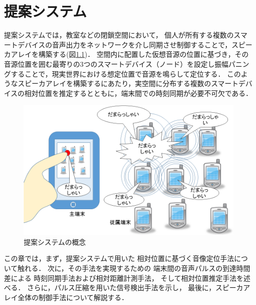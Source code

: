 
\chapter{提案システム}

提案システムでは，教室などの閉鎖空間において，
個人が所有する複数のスマートデバイスの音声出力をネットワークを介し同期させ制御することで，スピーカアレイを構築する(図\ref{fig:shikumi2})．
空間内に配置した仮想音源の位置に基づき，その音源位置を囲む最寄りの3つのスマートデバイス（ノード）を設定し振幅パニングすることで，現実世界における想定位置で音源を鳴らして定位する．
このようなスピーカアレイを構築するにあたり，実空間に分布する複数のスマートデバイスの相対位置を推定するとともに，端末間での時刻同期が必要不可欠である．

\begin{figure}[p]\centering
  \hspace{-2mm}\includegraphics[clip,width=1.1\hsize]{img/shikumi3.png}
  \caption{提案システムの概念}\label{fig:shikumi2}
\end{figure}

この章では，まず，提案システムで用いた
相対位置に基づく音像定位手法について触れる．
次に，その手法を実現するための
端末間の音声パルスの到達時間差による
時刻同期手法および相対距離計測手法，
そして相対位置推定手法を述べる．
さらに，パルス圧縮を用いた信号検出手法を示し，
最後に，スピーカアレイ全体の制御手法について解説する．









